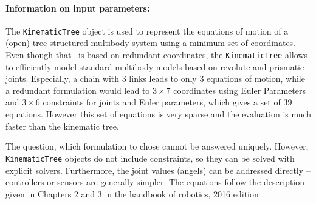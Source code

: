 \paragraph{Information on input parameters:} 
\finishTable
 \noindent
    The \texttt{KinematicTree} object is used to represent the equations of motion of a (open) tree-structured multibody system
    using a minimum set of coordinates. Even though that \codeName\ is based on redundant coordinates,
    the \texttt{KinematicTree} allows to efficiently model standard multibody models based on revolute and prismatic joints.
    Especially, a chain with 3 links leads to only 3 equations of motion, while a redundant formulation would lead
    to $3 \times 7$ coordinates using Euler Parameters and $3 \times 6$ constraints for joints and Euler parameters,
    which gives a set of 39 equations. However this set of equations is very sparse and the evaluation is much faster
    than the kinematic tree.

    The question, which formulation to chose cannot be answered uniquely. However, \texttt{KinematicTree} objects
    do not include constraints, so they can be solved with explicit solvers. Furthermore, the joint values (angels)
    can be addressed directly -- controllers or sensors are generally simpler.
    The equations follow the description given in Chapters 2 and 3 in the handbook of robotics, 2016 edition \cite{Siciliano2016}.

